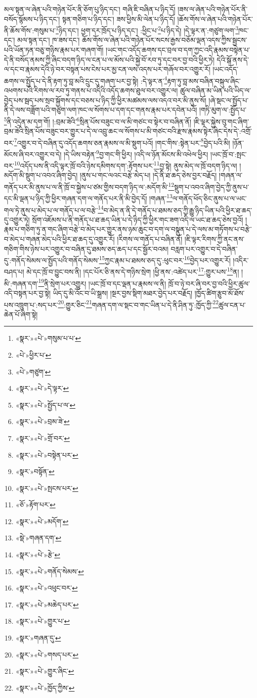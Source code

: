 མལ་སྟན་ལ་ཞེན་པའི་གཉེན་པོར་ནི་ཅོག་པུ་ཉིད་དང་། གཞི་ཇི་བཞིན་པ་ཉིད་དོ། །ཟས་ལ་ཞེན་པའི་གཉེན་པོར་ནི་བསོད་སྙོམས་པ་ཉིད་དང་། སྟན་གཅིག་པ་ཉིད་དང་། ཟས་ཕྱིས་མི་ལེན་པ་ཉིད་དོ། །ཆོས་གོས་ལ་ཞེན་པའི་གཉེན་པོར་ནི་ཆོས་གོས་:གསུམ་པ་\footnote{«སྣར་»«པེ་»གསུམ་པ་པ་}ཉིད་དང་། ཕྱག་དར་ཁྲོད་པ་ཉིད་དང་། :ཕྱིང་པ་\footnote{«པེ་»ཕྱིར་པ་}པ་ཉིད་དེ། །དེ་ལྟར་ན་:གཙུག་ལག་\footnote{«པེ་»གཙུག་}ཁང་དང་། མལ་སྟན་དང་། ཁ་ཟས་དང་། ཆོས་གོས་ལ་ཞེན་པའི་གཉེན་པོར་སངས་རྒྱས་བཅོམ་ལྡན་འདས་ཀྱིས་སྦྱངས་པའི་ཡོན་ཏན་བཅུ་གཉིས་རྣམ་པར་གཞག་གོ། །ཡང་གང་འདོད་ཆགས་དང་བྲལ་བ་དག་ཀྱང་འདི་རྣམས་བསྟེན་པ་དེ་ནི་བསོད་ནམས་ཀྱི་ཞིང་བདག་ཉིད་ལ་ངན་པ་ལ་མོས་པའི་སྐྱེ་བོ་རབ་ཏུ་དང་བར་བྱ་བའི་ཕྱིར་ཏེ། དེའི་སྒོ་ནས་དེ་ལ་དང་བ་རྣམས་དེའི་ཉེ་བར་བསྟན་པས་ངེས་པར་མྱ་ངན་ལས་འདས་པར་གཞོལ་བར་འགྱུར་རོ། །ཡང་འདོད་ཆགས་ལ་སྤྱོད་པ་དེ་ནི་རྟག་ཏུ་བླ་མའི་དྲུང་དུ་གཞག་པར་བྱ་སྟེ། :དེ་ལྟར་ན་\footnote{«སྣར་»«པེ་»དེ་ལྟར་}རྟག་ཏུ་བླ་མས་བཞིན་བསྐུལ་ཞིང་འཕགས་པའི་རིགས་ལ་རབ་ཏུ་གནས་པ་འདིའི་འདོད་ཆགས་ཐུལ་བར་འགྱུར་ལ། ཚུལ་བཞིན་མ་ཡིན་པའི་ཡིད་ལ་བྱེད་པས་སྦད་པས་སྲབ་སྐྱོགས་དང་བཅས་པ་ཉིད་ཀྱི་ཕྱིར་མཚམས་ལས་འདའ་བར་མི་ནུས་སོ། །ཞེ་སྡང་ལ་སྤྱོད་པ་ནི་དེ་ལས་བཟློག་པའི་གཙུག་ལག་ཁང་ལ་སོགས་པ་དག་དང་གནས་རྣམ་པར་དབེན་པའོ། །གཏི་མུག་ལ་:སྤྱོད་པ་\footnote{«སྣར་»«པེ་»སྤྱོད་པ་ལ་}ནི་འདྲེན་མ་དག་གོ། །:བྲམ་ཟེའི་\footnote{«སྣར་»«པེ་»བྲམ་ཟེ་}སྲིན་པོས་བཟུང་བ་ལ་མི་གཙང་བ་སྟེར་བ་བཞིན་ནོ། །ཇི་ལྟར་སྐྱེས་བུ་གང་ཞིག་བྲམ་ཟེའི་སྲིན་པོས་བཟུང་བར་གྱུར་པ་དེ་ལ་འབྲུ་ཆང་ལ་སོགས་པ་མི་གཙང་བའི་རྫས་རྣམས་སྟེར་ཞིང་དེས་དེ་:འགྲོ་བར་\footnote{«སྣར་»«པེ་»གྲོ་བར་}འགྱུར་བ་དེ་བཞིན་དུ་འདོད་ཆགས་ཅན་རྣམས་ལ་མི་སྡུག་པའོ། །གང་གིས་:སྟེན་པར་\footnote{«སྣར་»«པེ་»བསྟེན་པར་}བྱེད་པའི་མི། །ཉོན་མོངས་ཞི་བར་འགྱུར་བ་དེ། །དེ་ཡིས་བརྟེན་\footnote{«སྣར་»བསྟོན་}བྱ་གང་གི་ཕྱིར། །འདི་ལ་ཉོན་མོངས་མི་འཕེལ་ཕྱིར། །ཡང་ཁྲོ་བ་:སྤང་བར་\footnote{«སྣར་»«པེ་»སྤངས་པར་}འདོད་པས་ནི་འདི་ལྟར་ཁྲོ་བའི་ཉེས་དམིགས་དག་:རྟོགས་པར་\footnote{«ཅོ་»རྟོག་པར་}བྱ་སྟེ། ནུས་མེད་ལ་ཁྲོ་བདག་ཉིད་ལ། །མདོག་མི་སྡུག་པ་འབའ་ཞིག་བྱེད། །ནུས་པ་གང་ལའང་བརྩེ་མེད་པ། །དེ་ནི་ཐ་ཆད་ཅེས་བྱར་བརྗོད། །གཞན་ལ་གནོད་པར་མི་ནུས་པ་ལ་ནི་ཁྲོ་བ་སྐྱེས་པ་ཙམ་གྱིས་བདག་ཉིད་ལ་:མདོག་མི་\footnote{«སྣར་»«པེ་»མདོག་}སྡུག་པ་འབའ་ཞིག་བྱེད་ཀྱི་ནུས་པ་དང་མི་ལྡན་པ་ཉིད་ཀྱི་ཕྱིར་གཞན་དག་ལ་གནོད་པར་ནི་མི་བྱེད་དོ། །གཞན་\footnote{«སྡེ་»གཞན་དག་}ལ་གནོད་ཕོད་ཅིང་ནུས་པ་ལ་ཡང་གལ་ཏེ་ནུས་པ་མེད་པ་ལ་གནོད་པ་ལ་བརྩེ་\footnote{«སྣར་»«པེ་»རྩེ་}བ་མེད་ན་ནི་དེ་གནོད་པ་ཐམས་ཅད་ཀྱི་རྒྱུ་ཉིད་ཡིན་པའི་ཕྱིར་ཐ་ཆད་དུ་འགྱུར་ཏེ། སྲོག་འཇོམས་པ་ནི་གནོད་པ་ཐ་ཆད་ཡིན་པ་དེ་ཉིད་ཀྱི་ཕྱིར་གང་ཟག་འདི་ལ་ཡང་ཐ་ཆད་ཅེས་བྱའོ། །རྣམ་པ་གཅིག་ཏུ་ན་གང་ཞིག་བརྩེ་བ་མེད་པར་གྱུར་ནས་ཉམ་ཆུང་བ་དག་ལ་བསྣུན་པ་དེ་ལས་མ་གཏོགས་པ་བརྩེ་བ་མེད་པ་གཞན་མེད་པའི་ཕྱིར་ཐ་ཆད་དུ་འགྱུར་རོ། །རིགས་ལ་གནོད་པ་བཞིན་ནོ། །ཇི་ལྟར་རིགས་ཀྱི་ནང་ནས་གཅིག་གིས་ཉེས་པར་འགྱུར་བ་བཞིན་དུ་ཐམས་ཅད་ཆད་པ་དང་སྦྱོར་བའམ། བརླག་པར་འགྱུར་བ་དེ་བཞིན་དུ་:གནོད་སེམས་ལ་སྤྱོད་པའི་གནོད་སེམས་\footnote{«སྣར་»«པེ་»གནོད་སེམས་}ཀྱང་རྣམ་པ་ཐམས་ཅད་དུ་:ཕུང་བར་\footnote{«སྣར་»«པེ་»འཕུང་བར་}བྱེད་པར་འགྱུར་རོ། །འདིར་བཤད་པ། མེ་དང་ཁྲོ་བ་བྱུང་བས་ནི། །དང་པོར་ཅི་ནས་དེ་གཉིས་སྲེག །ཕྱི་ནས་:འཚེད་པར་\footnote{«སྣར་»«པེ་»མཆེད་པར་}:གྱུར་པས་\footnote{«སྣར་»«པེ་»གྱུར་པ་}ན། །མི་:གཞན་དག་\footnote{«སྣར་»གཞན་དུ་}ནི་སྲེག་པར་འགྱུར། །ཡང་ཁྲོ་བ་དང་ལྡན་པ་རྣམས་ལ་ནི། ཁྲོ་བ་ཉེ་བར་ཞི་བར་བྱ་བའི་ཕྱིར་ཚུལ་འདི་བསྟན་པར་བྱ་སྟེ། ཡིད་དུ་མི་འོང་བ་ཡི་སྒྲས། །སྔར་བྱས་སྡིག་མཐར་བྱེད་པར་བརྗོད། །ཁྱོད་ཚིག་རྩུབ་མོ་ཐོས་པས་འཁྲུག་པ་:སད་པར་\footnote{«སྣར་»«པེ་»གསད་པར་}:གྱུར་ཅིང་\footnote{«སྣར་»«པེ་»གྱུར་ཞིང་}གཞན་དག་ལ་སྡང་བ་གང་ཡིན་པ་དེ་ནི་ཤིན་ཏུ་:ཁྱོད་ཀྱི་\footnote{«སྣར་»«པེ་»ཁྱོད་ཀྱིས་}ཚུལ་ངན་པ་ཆེན་པོ་ཞིག་སྟེ། 